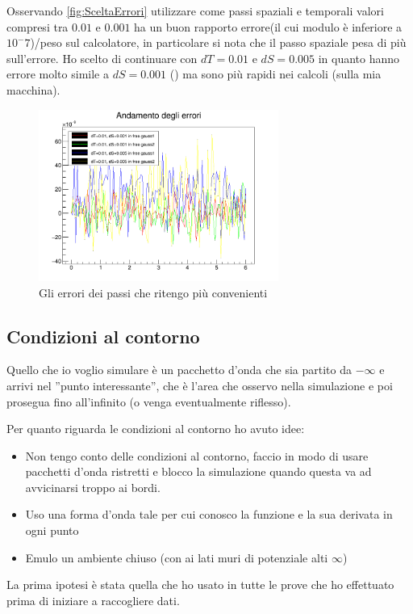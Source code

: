 Osservando \autoref{fig:SceltaErrori} utilizzare come passi spaziali e temporali valori compresi tra $0.01$ e $0.001$ ha un buon rapporto errore(il cui modulo \`e inferiore a $10^-7$)/peso sul calcolatore, in particolare si nota che il passo spaziale pesa di pi\`u sull'errore. Ho scelto di continuare con $dT = 0.01$ e $dS = 0.005$ in quanto hanno errore molto simile a $dS = 0.001$ () ma sono pi\`u rapidi nei calcoli (sulla mia macchina).

\begin{figure}[h]
\centering
\includegraphics[width=0.7\textwidth]{IMG/sceltaPassi}
\caption[Scelta Passi]{Gli errori dei passi che ritengo pi\`u convenienti}\label{fig:sceltaPassi}
\end{figure}

\subsection{Condizioni al contorno}
Quello che io voglio simulare \`e un pacchetto d'onda che sia partito da $-\infty$ e arrivi nel ''punto interessante'', che \`e l'area che osservo nella simulazione e poi prosegua fino all'infinito (o venga eventualmente riflesso).

Per quanto riguarda le condizioni al contorno ho avuto idee:
\begin{itemize}
	\item Non tengo conto delle condizioni al contorno, faccio in modo di usare pacchetti d'onda ristretti e blocco la simulazione quando questa va ad  avvicinarsi troppo ai bordi.
	\item Uso una forma d'onda tale per cui conosco la funzione e la sua derivata in ogni punto
	\item Emulo un ambiente chiuso (con ai lati muri di potenziale alti $\infty$)
\end{itemize}
La prima ipotesi \`e stata quella che ho usato in tutte le prove che ho effettuato prima di iniziare a raccogliere dati.

